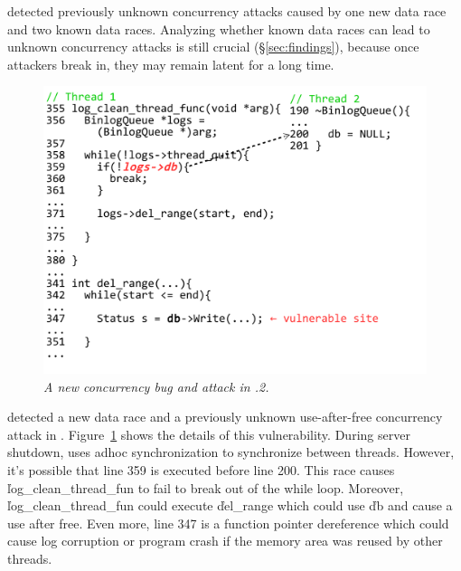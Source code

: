 \xxx detected \nunknownVul previously unknown concurrency attacks caused by 
one new data race and two known data races. Analyzing whether known data races 
can lead to unknown concurrency attacks is still crucial (\S\ref{sec:findings}), 
because once attackers break in, they may remain latent for a long time.


\begin{figure}[h]
	\centering
	\includegraphics[width=0.9\columnwidth]{figures/ssdb}
	\vspace{-.25in}
	\caption{{\em A new concurrency bug and attack in .2.}} 
	\label{fig:ssdb}
	\vspace{-.2in}
\end{figure}

\xxx detected a new data race and a previously unknown use-after-free 
concurrency attack in \ssdb. Figure~\ref{fig:ssdb} shows the details of 
this vulnerability. During server shutdown, \ssdb uses adhoc synchronization to 
synchronize between threads. However, it's possible that line 359 is executed 
before line 200. This race causes \v{log\_clean\_thread\_fun} to fail to break 
out of the while loop. Moreover, \v{log\_clean\_thread\_fun} could execute 
\v{del\_range} which could use \v{db} and cause a use after free. Even 
more, line 347 is a function pointer dereference which could cause log 
corruption or program crash if the memory area was reused by other threads.

